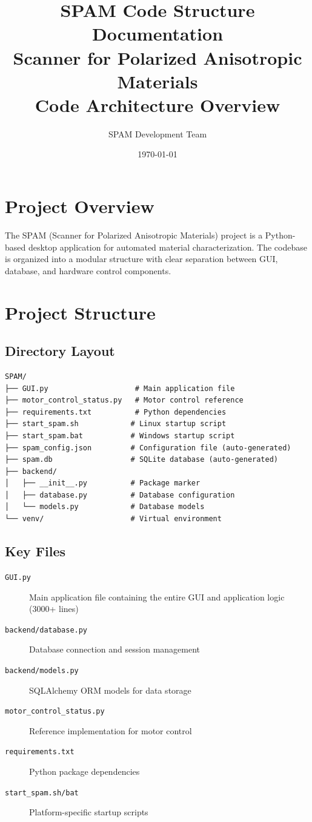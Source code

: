 \documentclass[11pt,a4paper]{article}
\title{\textbf{SPAM Code Structure Documentation}\\
\large Scanner for Polarized Anisotropic Materials\\
\large Code Architecture Overview}
\author{SPAM Development Team}
\date{\today}
\begin{document}
\maketitle
\tableofcontents
\newpage

\section{Project Overview}

The SPAM (Scanner for Polarized Anisotropic Materials) project is a Python-based desktop application for automated material characterization. The codebase is organized into a modular structure with clear separation between GUI, database, and hardware control components.

\section{Project Structure}

\subsection{Directory Layout}
\begin{verbatim}
SPAM/
├── GUI.py                    # Main application file
├── motor_control_status.py   # Motor control reference
├── requirements.txt          # Python dependencies
├── start_spam.sh            # Linux startup script
├── start_spam.bat           # Windows startup script
├── spam_config.json         # Configuration file (auto-generated)
├── spam.db                  # SQLite database (auto-generated)
├── backend/
│   ├── __init__.py          # Package marker
│   ├── database.py          # Database configuration
│   └── models.py            # Database models
└── venv/                    # Virtual environment
\end{verbatim}

\subsection{Key Files}

\begin{description}
    \item[\texttt{GUI.py}] Main application file containing the entire GUI and application logic (3000+ lines)
    \item[\texttt{backend/database.py}] Database connection and session management
    \item[\texttt{backend/models.py}] SQLAlchemy ORM models for data storage
    \item[\texttt{motor\_control\_status.py}] Reference implementation for motor control
    \item[\texttt{requirements.txt}] Python package dependencies
    \item[\texttt{start\_spam.sh/bat}] Platform-specific startup scripts
\end{description}
\end{document}
